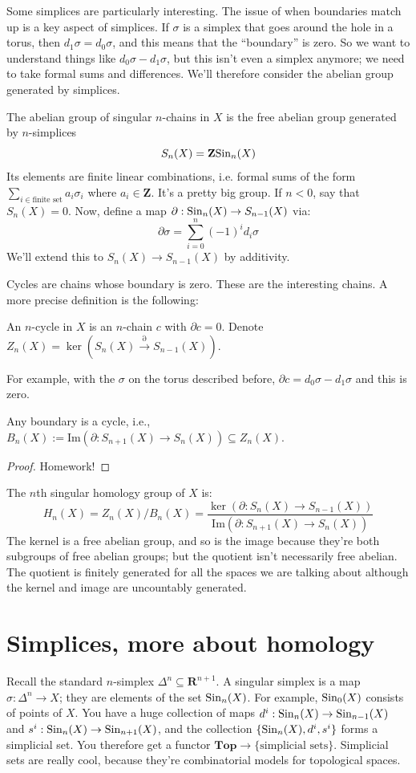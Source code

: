 Some simplices are particularly interesting. The issue of when boundaries match up is a key aspect of simplices. If $\sigma$ is a simplex that goes around the hole in a torus, then $d_1\sigma = d_0\sigma$, and this means that the ``boundary'' is zero. So we want to understand things like $d_0\sigma - d_1\sigma$, but this isn't even a simplex anymore; we need to take formal sums and differences. We'll therefore consider the abelian group generated by simplices.
\begin{definition}
The abelian group of singular $n$-chains in $X$ is the free abelian group generated by $n$-simplices
$$S_n(X) = \mathbf{Z}\mathrm{Sin}_n(X)$$
    Its elements are finite linear combinations, i.e. formal sums of the form $\sum_{i\in\text{finite set}}a_i\sigma_i$ where $a_i\in\mathbf{Z}$. It's a pretty big group. If $n<0$, say that $S_n(X)=0$. Now, define a map $\partial:\mathrm{Sin}_n(X)\to S_{n-1}(X)$ via:
$$\partial\sigma = \sum_{i=0}^n(-1)^i d_i\sigma$$
We'll extend this to $S_n(X) \to S_{n-1}(X)$ by additivity.
\end{definition}
Cycles are chains whose boundary is zero. These are the interesting chains. A more precise definition is the following:
\begin{definition}
An $n$-cycle in $X$ is an $n$-chain $c$ with $\partial c = 0$. Denote $Z_n(X) = \ker(S_n(X)\xrightarrow{\partial}S_{n-1}(X))$.
\end{definition}
For example, with the $\sigma$ on the torus described before, $\partial c = d_0\sigma - d_1\sigma$ and this is zero.
\begin{theorem}
Any boundary is a cycle, i.e., $B_n(X) := \mathrm{Im}(\partial:S_{n+1}(X)\to S_n(X))\subseteq Z_n(X)$.
\end{theorem}
\begin{proof}
    Homework!
\end{proof}
\begin{definition}
The $n$th singular homology group of $X$ is:
    $$ H_n(X) = Z_n(X)/B_n(X) = \frac{\ker(\partial:S_n(X)\to S_{n-1}(X))}{\mathrm{Im}(\partial:S_{n+1}(X)\to S_n(X))}$$
The kernel is a free abelian group, and so is the image because they're both subgroups of free abelian groups; but the quotient isn't necessarily free abelian. The quotient is finitely generated for all the spaces we are talking about although the kernel and image are uncountably generated.
\end{definition}
\section{Simplices, more about homology}
Recall the standard $n$-simplex $\Delta^n\subseteq\mathbf{R}^{n+1}$. A singular simplex is a map $\sigma:\Delta^n\to X$; they are elements of the set $\mathrm{Sin}_n(X)$. For example, $\mathrm{Sin}_0(X)$ consists of points of $X$. You have a huge collection of maps $d^i:\mathrm{Sin}_n(X)\to\mathrm{Sin}_{n-1}(X)$ and $s^i:\mathrm{Sin}_n(X)\to\mathrm{Sin}_{n+1}(X)$, and the collection $\{\mathrm{Sin}_n(X),d^i,s^i\}$ forms a simplicial set. You therefore get a functor $\mathbf{Top}\to\{\text{simplicial sets}\}$. Simplicial sets are really cool, because they're combinatorial models for topological spaces.

